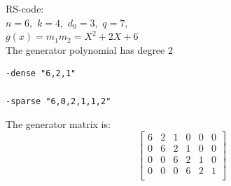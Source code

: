 \noindent
RS-code:\\
$n=6,$ $k=4,$ $d_0=3,$ $q=7,$ \\
$g(x) = m_{1}m_{2}=
X^{2} + 2X + 6$
\\
\bigskip
The generator polynomial has degree 2
\begin{verbatim}
-dense "6,2,1"

-sparse "6,0,2,1,1,2"

\end{verbatim}
The generator matrix is:
$$
\left[
\begin{array}{*{6}{c}}
6 & 2 & 1 & 0 & 0 & 0\\
0 & 6 & 2 & 1 & 0 & 0\\
0 & 0 & 6 & 2 & 1 & 0\\
0 & 0 & 0 & 6 & 2 & 1\\
\end{array}
\right]
$$
